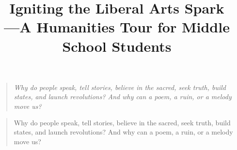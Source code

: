 \documentclass[UTF8,fontset=fandol,zihao=-4,openany]{ctexbook}
\title{\zihao{0}\bfseries Igniting the Liberal Arts Spark\\[0.5em] \zihao{2}\mdseries ---A Humanities Tour for Middle School Students}
\author{}
\date{}
\begin{document}
\frontmatter
\maketitle

\thispagestyle{empty}
\vspace*{\fill}
\begin{quote}\itshape
Why do people speak, tell stories, believe in the sacred, seek truth, build states, and launch revolutions? And why can a poem, a ruin, or a melody move us?
\end{quote}
\vspace*{\fill}
\cleardoublepage

\tableofcontents
\cleardoublepage

\begin{quote}
Why do people speak, tell stories, believe in the sacred, seek truth, build states, and launch revolutions? And why can a poem, a ruin, or a melody move us?
\end{quote}
\end{document}
